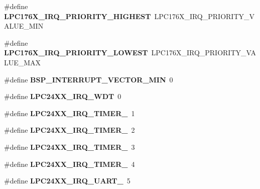 \begin{DoxyCompactItemize}
\#define {\bfseries L\+P\+C176\+X\+\_\+\+I\+R\+Q\+\_\+\+P\+R\+I\+O\+R\+I\+T\+Y\+\_\+\+H\+I\+G\+H\+E\+ST}~L\+P\+C176\+X\+\_\+\+I\+R\+Q\+\_\+\+P\+R\+I\+O\+R\+I\+T\+Y\+\_\+\+V\+A\+L\+U\+E\+\_\+\+M\+IN
\item 
\mbox{\label{group__bsp__interrupt_ga5ea728acf9d287d341b3e0b2688bf7cc}} 
\#define {\bfseries L\+P\+C176\+X\+\_\+\+I\+R\+Q\+\_\+\+P\+R\+I\+O\+R\+I\+T\+Y\+\_\+\+L\+O\+W\+E\+ST}~L\+P\+C176\+X\+\_\+\+I\+R\+Q\+\_\+\+P\+R\+I\+O\+R\+I\+T\+Y\+\_\+\+V\+A\+L\+U\+E\+\_\+\+M\+AX
\item 
\mbox{\label{group__bsp__interrupt_ga64cbb02dfea4d6923abccaa0087d2a0d}} 
\#define {\bfseries B\+S\+P\+\_\+\+I\+N\+T\+E\+R\+R\+U\+P\+T\+\_\+\+V\+E\+C\+T\+O\+R\+\_\+\+M\+IN}~0
\item 
\mbox{\label{group__bsp__interrupt_ga22ad843ead6134a00438c66d63c6196a}} 
\#define {\bfseries L\+P\+C24\+X\+X\+\_\+\+I\+R\+Q\+\_\+\+W\+DT}~0
\item 
\mbox{\label{group__bsp__interrupt_gaf7ccbd4f0e2179458af481c972f8eb77}} 
\#define {\bfseries L\+P\+C24\+X\+X\+\_\+\+I\+R\+Q\+\_\+\+T\+I\+M\+E\+R\+\_}~1
\item 
\mbox{\label{group__bsp__interrupt_ga88e060c9e08934c8164139e312a5957d}} 
\#define {\bfseries L\+P\+C24\+X\+X\+\_\+\+I\+R\+Q\+\_\+\+T\+I\+M\+E\+R\+\_}~2
\item 
\mbox{\label{group__bsp__interrupt_ga07f9edf00f261e7c8aea57c7d2857277}} 
\#define {\bfseries L\+P\+C24\+X\+X\+\_\+\+I\+R\+Q\+\_\+\+T\+I\+M\+E\+R\+\_}~3
\item 
\mbox{\label{group__bsp__interrupt_ga1fe241b6e5be9296a7c60f1566d2875c}} 
\#define {\bfseries L\+P\+C24\+X\+X\+\_\+\+I\+R\+Q\+\_\+\+T\+I\+M\+E\+R\+\_}~4
\item 
\mbox{\label{group__bsp__interrupt_gaccb730ad2b96b5de21622342fa4f531c}} 
\#define {\bfseries L\+P\+C24\+X\+X\+\_\+\+I\+R\+Q\+\_\+\+U\+A\+R\+T\+\_}~5
\item 
\mbox{\label{group__bsp__interrupt_gacb06c8eb75999865db1b99b5cddce4d7}} 

\end{DoxyCompactItemize}
